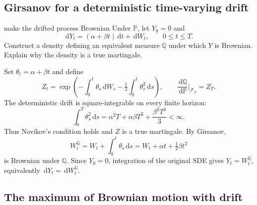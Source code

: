 \documentclass[10pt]{article}
\newcommand{\Pp}{\mathbb P}
\newcommand{\Q}{\mathbb Q}
\newcommand{\1}{\mathbf 1}
\newcommand{\cF}{\mathcal F}
\newcommand{\dd}{\,\mathrm d}
\theoremstyle{definition}
\begin{document}
\subsection{Girsanov for a deterministic time-varying drift}

\begin{studentexercise}{make the drifted process Brownian}
Under \(\Pp\), let \(Y_0=0\) and
\[
\dd Y_t=(\alpha+\beta t)\dd t+\dd W_t,
\qquad 0\leq t\leq T.
\]
Construct a density defining an equivalent measure \(\Q\) under which
\(Y\) is Brownian. Explain why the density is a true martingale.
\end{studentexercise}
\begin{shortsolution}
Set \(\theta_t=\alpha+\beta t\) and define
\[
Z_t=\exp\!\left(-\int_0^t\theta_s\dd W_s
 -\tfrac12\int_0^t\theta_s^2\dd s\right),
\qquad
\frac{\dd\Q}{\dd\Pp}\bigg|_{\cF_T}=Z_T.
\]
The deterministic drift is square-integrable on every finite horizon:
\[
\int_0^T\theta_s^2\dd s
=\alpha^2T+\alpha\beta T^2+\frac{\beta^2T^3}{3}<\infty.
\]
Thus Novikov's condition holds and \(Z\) is a true martingale. By
Girsanov,
\[
W_t^\Q=W_t+\int_0^t\theta_s\dd s
=W_t+\alpha t+\tfrac12\beta t^2
\]
is Brownian under \(\Q\). Since \(Y_0=0\), integration of the original
SDE gives \(Y_t=W_t^\Q\), equivalently \(\dd Y_t=\dd W_t^\Q\).
\end{shortsolution}

\subsection{The maximum of Brownian motion with drift}
\end{document}
